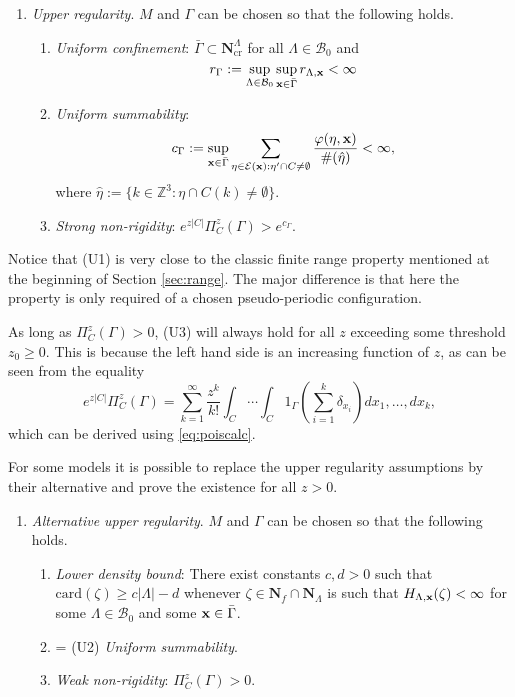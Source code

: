 \begin{enumerate}[\textbf{(U)}] 
	\item \textit{Upper regularity}. $M$ and $\Gamma$ can be chosen so that the following holds. 
		\begin{enumerate}[(U1)]
			\item \textit{Uniform confinement}: $\bar \Gamma \subset \mathbf N^\Lambda_\text{cr}$ for all $\Lambda \in \mathcal B_0$ and 
			\begin{equation}\label{eq:U1}r_\Gamma := \sup_{\Lambda\in\mathcal B_0}\sup_{{\mathbf{x}} \in \bar\Gamma} r_{\Lambda, {\mathbf{x}}} < \infty\end{equation}
			\item \textit{Uniform summability}: 
			$$c_\Gamma := \sup_{{\mathbf{x}} \in \bar\Gamma}  \sum_{\eta \in \mathcal E({\mathbf{x}}): \eta' \cap C \neq \emptyset} \frac{\varphi(\eta,{\mathbf{x}})}{\#(\hat\eta)} < \infty,$$
where $\hat\eta := \{k \in \mathbb Z^3: \eta \cap C(k) \neq \emptyset\}$.
\item \textit{Strong non-rigidity}: $e^{z|C|} \Pi^z_C(\Gamma) > e^{c_\Gamma}$.
		\end{enumerate}
\end{enumerate}

Notice that (U1) is very close to the classic finite range property mentioned at the beginning of Section \ref{sec:range}. The major difference is that here the property is only required of a chosen pseudo-periodic configuration.


As long as $\Pi^z_C (\Gamma) >0$, (U3) will always hold for all $z$ exceeding some threshold $z_0 \geq 0$. This is because the left hand side is an increasing function of $z$, as can be seen from the equality 
$$e^{z|C|} \Pi^z_C(\Gamma) = \sum^\infty_{k=1} \frac{z^k}{k!} \int_C \cdots \int_C 1_{\Gamma} \left(\sum^k_{i=1} \delta_{x_i}\right) dx_1, \dots, dx_k,$$
which can be derived using \eqref{eq:poiscalc}. 



For some models it is possible to replace the upper regularity assumptions by their alternative and prove the existence for all $z>0$.

\begin{enumerate}[(\textbf{\^{U}})]
	\item \textit{Alternative upper regularity}. $M$ and $\Gamma$ can be chosen so that the following holds.
	\begin{enumerate}[(\^U1)]
		\item \textit{Lower density bound}: There exist constants $c,d > 0$ such that $\mathrm{card}(\zeta) \geq c|\Lambda| - d$ whenever $\zeta \in \mathbf N_f\cap\mathbf  N_\Lambda$ is such that $H_{\Lambda,{\mathbf{x}}}(\zeta)<\infty$ for some $\Lambda \in \mathcal B_0$ and some ${\mathbf{x}} \in \bar\Gamma$.
		\item = (U2) \textit{Uniform summability}.
		\item \textit{Weak non-rigidity}: $\Pi^z_C(\Gamma) > 0$.
	\end{enumerate}
\end{enumerate}






